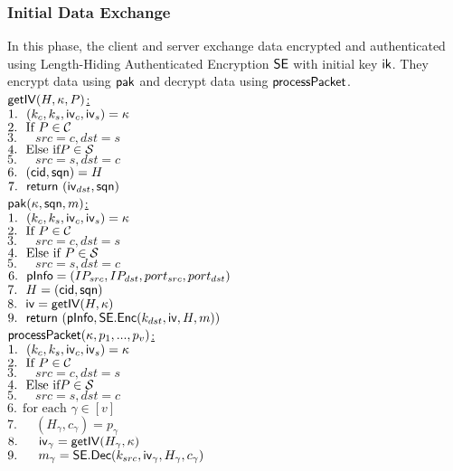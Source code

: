 \subsubsection{Initial Data Exchange}
In this phase, the client and server exchange data
encrypted and authenticated using Length-Hiding
Authenticated Encryption $\mathsf{SE}$ with initial key $\mathsf{ik}$.
They encrypt data using $\mathsf{pak}$ and decrypt data using
$\mathsf{processPacket}$.
\\
\noindent
\underline{$\mathsf{getIV}(H, \kappa, P)$:} \\
 $1.\ \ (k_c, k_s, \mathsf{iv}_c, \mathsf{iv}_s) = \kappa$ \\
 $2.\ \ \text{If } P \in \mathcal{C}$ \\
 $3.\ \ \quad src = c, dst = s$ \\
 $4.\ \ \text{Else if} P \in \Server$ \\
 $5.\ \ \quad src = s, dst = c$ \\
 $6.\ \ (\mathsf{cid}, \mathsf{sqn}) = H$ \\
 $7.\ \ \mathsf{return}\ (\mathsf{iv}_{dst}, \mathsf{sqn})$ \\
\underline{$\mathsf{pak}(\kappa, \mathsf{sqn}, m)$:} \\
 $1.\ \ (k_c, k_s, \mathsf{iv}_c, \mathsf{iv}_s) = \kappa$ \\
 $2.\ \ \text{If } P \in \mathcal{C}$ \\
 $3.\ \ \quad src = c, dst = s$ \\
 $4.\ \ \text{Else if } P \in \Server$ \\
 $5.\ \ \quad src = s, dst = c$ \\
 $6.\ \ \mathsf{pInfo} = (IP_{src}, IP_{dst}, port_{src}, port_{dst})$ \\
 $7.\ \ H = (\mathsf{cid}, \mathsf{sqn})$ \\
 $8.\ \ \mathsf{iv} = \mathsf{getIV}(H, \kappa)$ \\
 $9.\ \ \mathsf{return}\ (\mathsf{pInfo}, \mathsf{SE}.\mathsf{Enc}(k_{dst}, \mathsf{iv}, H, m) )$ \\
\underline{$\mathsf{processPacket}(\kappa, p_1,...,p_v)$:} \\
 $1.\ \ (k_c, k_s, \mathsf{iv}_c, \mathsf{iv}_s) = \kappa$ \\
 $2.\ \ \text{If } P \in \mathcal{C}$ \\
 $3.\ \ \quad src = c, dst = s$ \\
 $4.\ \ \text{Else if} P \in \Server$ \\
 $5.\ \ \quad src = s, dst = c$ \\
 $6.\ \ \text{for each } \gamma \in [v]$ \\
 $7.\ \ \quad (H_{\gamma}, c_{\gamma}) = p_{\gamma}$ \\
 $8.\ \ \quad \mathsf{iv}_{\gamma} = \mathsf{getIV}(H_{\gamma}, \kappa)$ \\
 $9.\ \ \quad m_{\gamma} = \mathsf{SE}.\mathsf{Dec}(k_{src}, \mathsf{iv}_{\gamma}, H_{\gamma}, c_{\gamma})$ \\